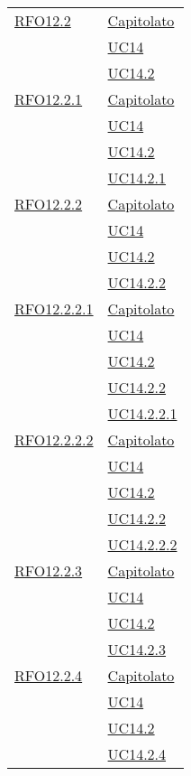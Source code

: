 \begin{longtable}{|>{\centering}m{5cm}|m{5cm}<{\centering}|}
 \hyperlink{RFO12.2}{RFO12.2} & \hyperlink{Capitolato}{Capitolato}\\
& \hyperref[UC14]{UC14}\\
& \hyperref[UC14.2]{UC14.2}\\\hline

 \hyperlink{RFO12.2.1}{RFO12.2.1} & \hyperlink{Capitolato}{Capitolato}\\
& \hyperref[UC14]{UC14}\\
& \hyperref[UC14.2]{UC14.2}\\
& \hyperref[UC14.2.1]{UC14.2.1}\\\hline

 \hyperlink{RFO12.2.2}{RFO12.2.2} & \hyperlink{Capitolato}{Capitolato}\\
& \hyperref[UC14]{UC14}\\
& \hyperref[UC14.2]{UC14.2}\\
& \hyperref[UC14.2.2]{UC14.2.2}\\\hline

 \hyperlink{RFO12.2.2.1}{RFO12.2.2.1} & \hyperlink{Capitolato}{Capitolato}\\
& \hyperref[UC14]{UC14}\\
& \hyperref[UC14.2]{UC14.2}\\
& \hyperref[UC14.2.2]{UC14.2.2}\\
& \hyperref[UC14.2.2.1]{UC14.2.2.1}\\\hline

 \hyperlink{RFO12.2.2.2}{RFO12.2.2.2} & \hyperlink{Capitolato}{Capitolato}\\
& \hyperref[UC14]{UC14}\\
& \hyperref[UC14.2]{UC14.2}\\
& \hyperref[UC14.2.2]{UC14.2.2}\\
& \hyperref[UC14.2.2.2]{UC14.2.2.2}\\\hline

 \hyperlink{RFO12.2.3}{RFO12.2.3} & \hyperlink{Capitolato}{Capitolato}\\
& \hyperref[UC14]{UC14}\\
& \hyperref[UC14.2]{UC14.2}\\
& \hyperref[UC14.2.3]{UC14.2.3}\\\hline

 \hyperlink{RFO12.2.4}{RFO12.2.4} & \hyperlink{Capitolato}{Capitolato}\\
& \hyperref[UC14]{UC14}\\
& \hyperref[UC14.2]{UC14.2}\\
& \hyperref[UC14.2.4]{UC14.2.4}\\\hline


\end{longtable}
